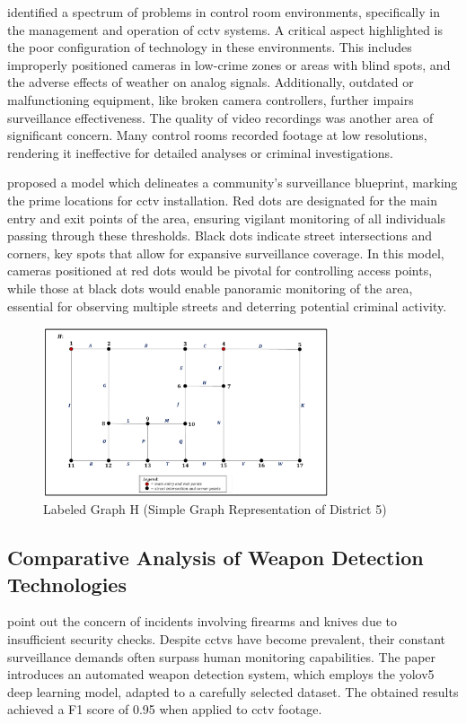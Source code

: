 \citet{rfc42} identified a spectrum of problems in control room environments, specifically in the management and operation of \ac{cctv} systems. A critical aspect highlighted is the poor configuration of technology in these environments. This includes improperly positioned cameras in low-crime zones or areas with blind spots, and the adverse effects of weather on analog signals. Additionally, outdated or malfunctioning equipment, like broken camera controllers, further impairs surveillance effectiveness. The quality of video recordings was another area of significant concern. Many control rooms recorded footage at low resolutions, rendering it ineffective for detailed analyses or criminal investigations.

\cite{rfc46} proposed a model which delineates a community's surveillance blueprint, marking the prime locations for \ac{cctv} installation. Red dots are designated for the main entry and exit points of the area, ensuring vigilant monitoring of all individuals passing through these thresholds. Black dots indicate street intersections and corners, key spots that allow for expansive surveillance coverage. In this model, cameras positioned at red dots would be pivotal for controlling access points, while those at black dots would enable panoramic monitoring of the area, essential for observing multiple streets and deterring potential criminal activity. 

\begin{figure}[h]
    \centering 
    \includegraphics[width=0.75\textwidth]{figs/cctv-positions.png} 
    \caption{Labeled Graph H (Simple Graph Representation of District 5) \cite{rfc46}}
    \label{fig:cctv-positions}
\end{figure}

\subsection{Comparative Analysis of Weapon Detection Technologies}
\citet{rfc3} point out the concern of incidents involving firearms and knives due to insufficient security checks. Despite \ac{cctv}s have become prevalent, their constant surveillance demands often surpass human monitoring capabilities. The paper introduces an automated weapon detection system, which employs the \ac{yolo}v5 deep learning model, adapted to a carefully selected dataset. The obtained results achieved a F1 score of 0.95 when applied to \ac{cctv} footage.


